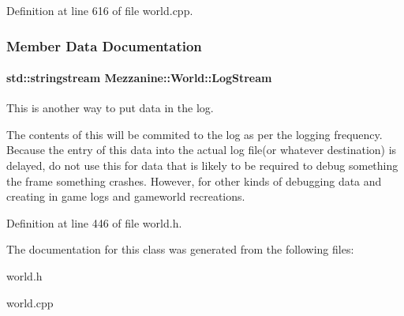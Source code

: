 Definition at line 616 of file world.cpp.



\subsubsection{Member Data Documentation}
\hypertarget{classMezzanine_1_1World_a32b1c4de1bbf5495452e463802ffa499}{
\paragraph[{LogStream}]{\setlength{\rightskip}{0pt plus 5cm}std::stringstream {\bf Mezzanine::World::LogStream}}\hfill}
\label{classMezzanine_1_1World_a32b1c4de1bbf5495452e463802ffa499}


This is another way to put data in the log. 

The contents of this will be commited to the log as per the logging frequency. Because the entry of this data into the actual log file(or whatever destination) is delayed, do not use this for data that is likely to be required to debug something the frame something crashes. However, for other kinds of debugging data and creating in game logs and gameworld recreations. 

Definition at line 446 of file world.h.



The documentation for this class was generated from the following files:\begin{DoxyCompactItemize}
\item 
world.h\item 
world.cpp\end{DoxyCompactItemize}
